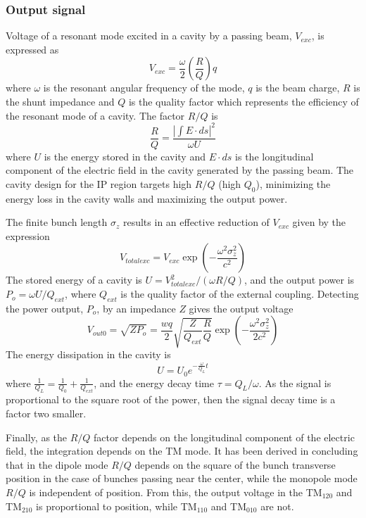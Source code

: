 \subsubsection{Output signal}
Voltage of a resonant mode excited in a cavity by a passing beam, $V_{exc}$, is expressed as
\begin{equation}
 V_{exc}=\frac{\omega}{2}\left(\frac{R}{Q}\right)q
\end{equation}
where $\omega$ is the resonant angular frequency of the mode, $q$ is the beam charge, $R$ is the shunt impedance and $Q$ is the quality factor which represents the efficiency of the resonant mode of a cavity. The factor $R/Q$ is
\begin{equation}
 \frac{R}{Q}=\frac{|\int E\cdot ds|^2}{\omega U}
\end{equation}
where $U$ is the energy stored in the cavity and $E\cdot ds$ is the longitudinal component of the electric field in the cavity generated by the passing beam. The cavity design for the IP region targets high $R/Q$ (high $Q_0$), minimizing the energy loss in the cavity walls and maximizing the output power.\par
The finite bunch length $\sigma_z$ results in an effective reduction of $V_{exc}$ given by the expression
\begin{equation}
 V_{totalexc}=V_{exc}\exp\left(-\frac{\omega^2\sigma_z^2}{c^2}\right)
\end{equation}
The stored energy of a cavity is $U=V_{totalexc}^2/(\omega R/Q)$, and the output power is $P_o=\omega U/Q_{ext}$, where $Q_{ext}$ is the quality factor of the external coupling. Detecting the power output, $P_o$, by an impedance $Z$ gives the output voltage
\begin{equation}
 V_{out0}=\sqrt{ZP_{o}}=\frac{wq}{2}\sqrt{\frac{Z}{Q_{ext}}\frac{R}{Q}}\exp\left(-\frac{\omega^2\sigma_z^2}{2c^2}\right)
\end{equation}
The energy dissipation in the cavity is
\begin{equation}
 U=U_0 e^{-\frac{\omega}{Q_L}t}
\end{equation}
where $\frac{1}{Q_L}=\frac{1}{Q_0}+\frac{1}{Q_{ext}}$, and the energy decay time $\tau=Q_L/\omega$. As the signal is proportional to the square root of the power, then the signal decay time is a factor two smaller.\par
Finally, as the $R/Q$ factor depends on the longitudinal component of the electric field, the integration depends on the TM mode. It has been derived in \cite{Nakathese} concluding that in the dipole mode $R/Q$ depends on the square of the bunch transverse position in the case of bunches passing near the center, while the monopole mode $R/Q$ is independent of position. From this, the output voltage in the TM$_{120}$ and TM$_{210}$ is proportional to position, while TM$_{110}$ and TM$_{010}$ are not.\par

